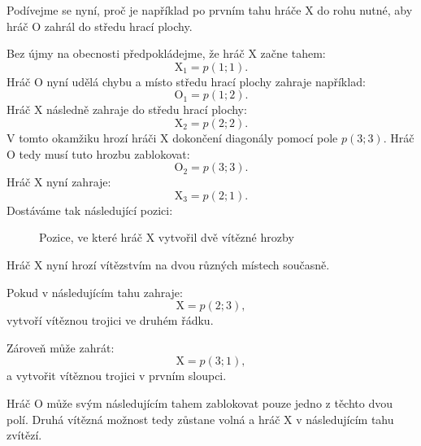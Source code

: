\documentclass[12pt,a4paper]{article}
\begin{document}
Podívejme se nyní, proč je například po prvním tahu hráče $\mathrm{X}$ do rohu nutné, 
aby hráč $\mathrm{O}$ zahrál do středu hrací plochy.

Bez újmy na obecnosti předpokládejme, že hráč $\mathrm{X}$ začne tahem:
\[
    \mathrm{X}_1=p(1;1).
\]
Hráč $\mathrm{O}$ nyní udělá chybu a místo středu hrací plochy zahraje například:
\[
    \mathrm{O}_1=p(1;2).
\]
Hráč $\mathrm{X}$ následně zahraje do středu hrací plochy:
\[
    \mathrm{X}_2=p(2;2).
\]
V tomto okamžiku hrozí hráči $\mathrm{X}$ dokončení diagonály pomocí pole $p(3;3)$. 
Hráč $\mathrm{O}$ tedy musí tuto hrozbu zablokovat:
\[
    \mathrm{O}_2=p(3;3).
\]
Hráč $\mathrm{X}$ nyní zahraje:
\[
    \mathrm{X}_3=p(2;1).
\]
Dostáváme tak následující pozici:

\begin{figure}[h]
    \begin{center}
    \end{center}

    \caption{Pozice, ve které hráč $\mathrm{X}$ vytvořil dvě vítězné hrozby}
    \label{fig:TicTacToeVidlicka}
\end{figure}

Hráč $\mathrm{X}$ nyní hrozí vítězstvím na dvou různých místech současně.

Pokud v následujícím tahu zahraje:
\[
    \mathrm{X}=p(2;3),
\]
vytvoří vítěznou trojici ve druhém řádku.

Zároveň může zahrát:
\[
    \mathrm{X}=p(3;1),
\]
a vytvořit vítěznou trojici v prvním sloupci.

Hráč $\mathrm{O}$ může svým následujícím tahem zablokovat pouze jedno z těchto dvou polí.
Druhá vítězná možnost tedy zůstane volná a hráč $\mathrm{X}$ v následujícím tahu zvítězí.
\end{document}
